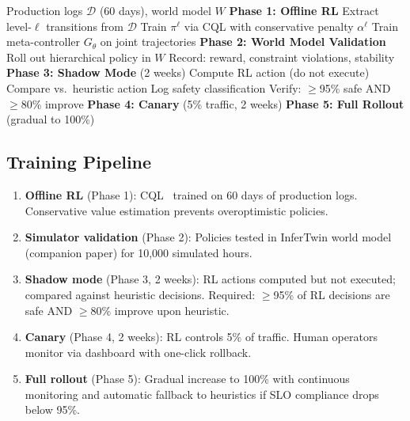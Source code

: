 \documentclass[conference,10pt]{IEEEtran}
\begin{document}
\begin{algorithm}[!t]
\caption{Hierarchical RL Training Pipeline}
\label{alg:train}
\begin{algorithmic}[1]
\Require Production logs $\mathcal{D}$ (60 days), world model $W$
\State \textbf{Phase 1: Offline RL}
    \State Extract level-$\ell$ transitions from $\mathcal{D}$
    \State Train $\pi^\ell$ via CQL with conservative penalty $\alpha^\ell$
\EndFor
\State Train meta-controller $G_\theta$ on joint trajectories
\State \textbf{Phase 2: World Model Validation}
    \State Roll out hierarchical policy in $W$
    \State Record: reward, constraint violations, stability
\EndFor
\State \textbf{Phase 3: Shadow Mode} (2 weeks)
    \State Compute RL action (do not execute)
    \State Compare vs.\ heuristic action
    \State Log safety classification
\EndFor
\State Verify: $\geq$95\% safe AND $\geq$80\% improve
\State \textbf{Phase 4: Canary} (5\% traffic, 2 weeks)
\State \textbf{Phase 5: Full Rollout} (gradual to 100\%)
\end{algorithmic}
\end{algorithm}

\subsection{Training Pipeline}

\begin{enumerate}
\item \textbf{Offline RL} (Phase 1): CQL~\cite{kumar2020conservative} trained on 60 days of production logs. Conservative value estimation prevents overoptimistic policies.
\item \textbf{Simulator validation} (Phase 2): Policies tested in InferTwin world model (companion paper) for 10,000 simulated hours.
\item \textbf{Shadow mode} (Phase 3, 2 weeks): RL actions computed but not executed; compared against heuristic decisions. Required: $\geq$95\% of RL decisions are safe AND $\geq$80\% improve upon heuristic.
\item \textbf{Canary} (Phase 4, 2 weeks): RL controls 5\% of traffic. Human operators monitor via dashboard with one-click rollback.
\item \textbf{Full rollout} (Phase 5): Gradual increase to 100\% with continuous monitoring and automatic fallback to heuristics if SLO compliance drops below 95\%.
\end{enumerate}
\end{document}
